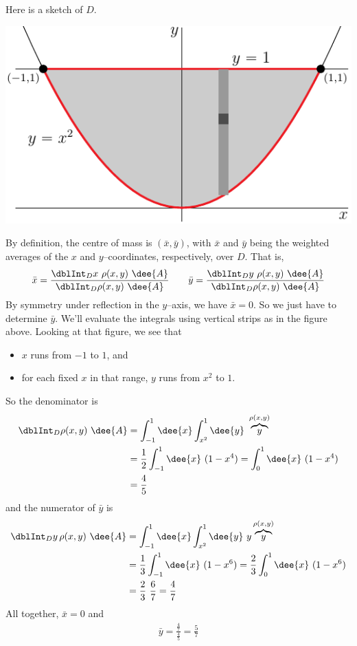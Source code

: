\begin{solution}
Here is a sketch of $D$.

\begin{center}
     \includegraphics{fig/OE05D_7.pdf}
\end{center}

By definition, the centre of mass is $(\bar x, \bar y)$,
with $\bar x$ and $\bar y$ being the weighted averages  of the $x$ and 
$y$--coordinates, respectively, over $D$. That is,
\begin{align*}
\bar x = \frac{\dblInt_D x\ \rho(x,y)\ \dee{A}}{\dblInt_D \rho(x,y)\ \dee{A}}
\qquad
\bar y = \frac{\dblInt_D y\ \rho(x,y)\ \dee{A}}{\dblInt_D \rho(x,y)\ \dee{A}}
\end{align*}
By symmetry under reflection in the $y$--axis, we have $\bar x=0$.
So we just have to determine $\bar y$. 
We'll evaluate the integrals using vertical strips as in the figure above.
Looking at that figure, we see that
\begin{itemize}
\item 
$x$ runs from $-1$ to $1$, and
\item
for each fixed $x$ in that range, $y$ runs from $x^2$ to $1$.
\end{itemize}
So the denominator is
\begin{align*}
\dblInt_D \rho(x,y)\ \dee{A}
&= \int_{-1}^1\dee{x}\int_{x^2}^1\dee{y}\ \overbrace{y}^{\rho(x,y)} \\
&= \frac{1}{2}\int_{-1}^1 \dee{x}\ (1-x^4)
 =\int_0^1 \dee{x}\ (1-x^4) \\
&=\frac{4}{5}
\end{align*}
and the numerator of $\bar y$ is
\begin{align*}
\dblInt_D y\,\rho(x,y)\ \dee{A}
&= \int_{-1}^1\dee{x}\int_{x^2}^1\dee{y}\ y\overbrace{y}^{\rho(x,y)} \\
&= \frac{1}{3}\int_{-1}^1 \dee{x}\ (1-x^6)
 =\frac{2}{3}\int_0^1 \dee{x}\ (1-x^6) \\
&=\frac{2}{3}\ \frac{6}{7} = \frac{4}{7}
\end{align*}
All together, $\bar x=0$ and
\begin{align*}
\bar y = \frac{\frac{4}{7}} {\frac{4}{5}}
       =  \frac{5}{7}
\end{align*}
\end{solution}

